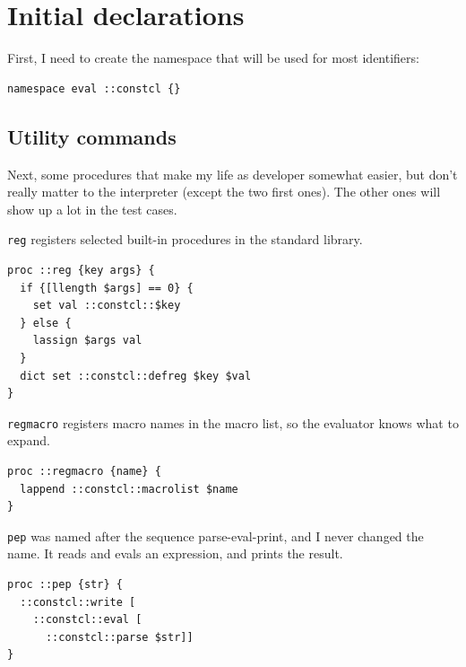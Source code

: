 \documentclass[twoside,9pt]{report}
\begin{document}
\chapter{Initial declarations}
\label{initial-declarations}

First, I need to create the namespace that will be used for most identifiers:

\noindent\makebox[\linewidth]{\rule{\linewidth}{0.4pt}}
\begin{lstlisting}
namespace eval ::constcl {}
\end{lstlisting}
\noindent\makebox[\linewidth]{\rule{\linewidth}{0.4pt}}
\section{Utility commands}
\label{utility-commands}

Next, some procedures that make my life as developer somewhat easier, but don't really matter to the interpreter (except the two first ones). The other ones will show up a lot in the test cases.


\texttt{reg} registers selected built-in procedures in the standard library.

\noindent\makebox[\linewidth]{\rule{\linewidth}{0.4pt}}
\begin{lstlisting}
proc ::reg {key args} {
  if {[llength $args] == 0} {
    set val ::constcl::$key
  } else {
    lassign $args val
  }
  dict set ::constcl::defreg $key $val
}
\end{lstlisting}
\noindent\makebox[\linewidth]{\rule{\linewidth}{0.4pt}}

\texttt{regmacro} registers macro names in the macro list, so the evaluator knows what to expand.

\noindent\makebox[\linewidth]{\rule{\linewidth}{0.4pt}}
\begin{lstlisting}
proc ::regmacro {name} {
  lappend ::constcl::macrolist $name
}
\end{lstlisting}
\noindent\makebox[\linewidth]{\rule{\linewidth}{0.4pt}}

\texttt{pep} was named after the sequence parse-eval-print, and I never changed the name. It reads and evals an expression, and prints the result.

\noindent\makebox[\linewidth]{\rule{\linewidth}{0.4pt}}
\begin{lstlisting}
proc ::pep {str} {
  ::constcl::write [
    ::constcl::eval [
      ::constcl::parse $str]]
}
\end{lstlisting}
\noindent\makebox[\linewidth]{\rule{\linewidth}{0.4pt}}
\end{document}
